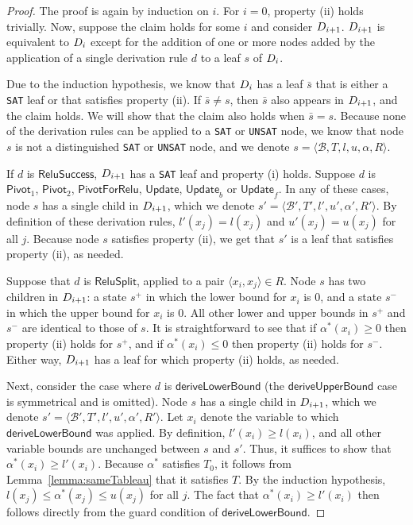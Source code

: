 \documentclass[a4paper]{llncs}
\newcommand{\basic}{\mathcal{B}}
\newcommand{\ub}{u}
\newcommand{\lb}{l}
\newcommand{\reluSet}{R}
\newcommand{\assignment}{\alpha{}}
\newcommand{\sat}{\texttt{SAT}}
\newcommand{\unsat}{\texttt{UNSAT}}
\newcommand{\rulename}[1]{\ensuremath{\mathsf{#1}}\xspace}
\newcommand{\irulename}[2]{\ensuremath{\mathsf{#1}_{#2}}\xspace}
\newcommand{\pivot}[1]{\irulename{Pivot}{#1}}
\newcommand{\update}{\rulename{Update}}
\newcommand{\updateb}{\irulename{Update}{b}}
\newcommand{\updatef}{\irulename{Update}{f}}
\newcommand{\reluSuccess}{\rulename{ReluSuccess}}
\newcommand{\pivotForRelu}{\rulename{PivotForRelu}}
\newcommand{\reluSplit}{\rulename{ReluSplit}}
\newcommand{\learnUB}{\rulename{deriveUpperBound}}
\newcommand{\learnLB}{\rulename{deriveLowerBound}}
\begin{document}
\begin{proof}
The proof is again by induction on $i$. For $i=0$, property (ii)
holds trivially. 
Now, suppose the claim holds for some $i$ and consider
$D_{i+1}$.  $D_{i+1}$ is equivalent to
$D_i$ except for the addition of one or more nodes added by the
application of a single derivation rule $d$ to a leaf $s$ of $D_i$.

Due to the induction hypothesis, we know that $D_i$ has
a leaf $\bar{s}$ that is either a \sat{} leaf or that satisfies property
(ii). If $\bar{s}\neq s$, then $\bar{s}$ also appears in
$D_{i+1}$, and the claim holds. We will show that
the claim also holds when $\bar{s}=s$. 
Because none of the derivation rules can be applied to a \sat{} or
\unsat{} node, we know that node $s$ is not a distinguished \sat{} or
\unsat{} node, and we denote
$s = \langle \basic, T, \lb, \ub, \assignment, \reluSet \rangle$. 

If $d$ is \reluSuccess{}, $D_{i+1}$ has a \sat{} leaf
and property (i) holds.
Suppose $d$ is \pivot{1}, \pivot{2}, \pivotForRelu{}, \update{},
\updateb{} or \updatef{}. In any of these cases, node $s$ has a single
child in $D_{i+1}$, which we denote
$s' = \langle \basic', T', \lb', \ub', \assignment', \reluSet'
\rangle$. By definition of these derivation rules, $\lb'(x_j)=\lb(x_j)$ and
$\ub'(x_j)=\ub(x_j)$ for all $j$. Because node $s$ satisfies property
(ii), we get that 
$s'$ is a leaf that satisfies property (ii), as needed.

Suppose that $d$ is \reluSplit{}, applied to a pair $\langle
x_i,x_j\rangle\in R$. Node $s$ has two children in
$D_{i+1}$: a state $s^+$ in which the lower bound for
$x_i$ is $0$, and a
state $s^-$ in which the upper bound for $x_i$ is $0$. All other lower and upper bounds in
$s^+$ and $s^-$ are identical to those of $s$. It is straightforward
to see that if $\assignment^*(x_i)\geq 0$ then property (ii) holds
for $s^+$, and if $\assignment^*(x_i)\leq 0$ then property (ii)
holds for $s^-$. Either way, $D_{i+1}$ has a leaf for
which property (ii) holds, as needed.

\sloppy
Next, consider the case where  $d$ is \learnLB{}
 (the \learnUB{} case is symmetrical and is omitted).
Node $s$ has a single
child in $D_{i+1}$, which we denote
$s' = \langle \basic', T', \lb', \ub', \assignment', \reluSet'
\rangle$. Let $x_i$ denote the variable to which $\learnLB{}$ was applied.
By definition, $\lb'(x_i)\geq \lb(x_i)$, and all other variable bounds
are unchanged between $s$ and $s'$.
Thus, it suffices to show that $\assignment^*(x_i)\geq
\lb'(x_i)$. Because $\assignment^*$ satisfies $T_0$, it follows from 
Lemma~\ref{lemma:sameTableau} that it satisfies $T$. By the induction
hypothesis, $\lb(x_j)\leq\assignment^*(x_j)\leq\ub(x_j)$ for all
$j$. The fact that $\assignment^*(x_i)\geq\lb'(x_i)$ then follows
directly from the guard condition of \learnLB{}.


\end{proof}
\end{document}
